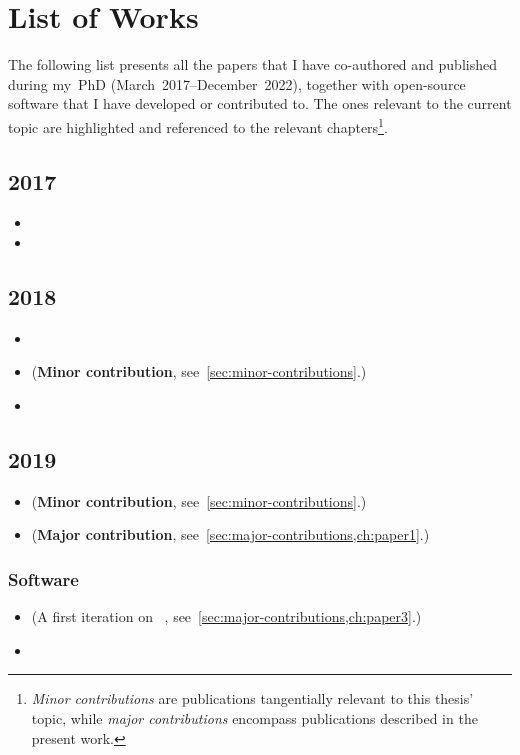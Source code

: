 \chapter{List of Works}%
\label{ch:all-works}

The following list presents all the papers that I have co-authored and published
during my~PhD (March~2017--December~2022),
together with open-source software that I have developed or contributed to.
The ones relevant to the current topic are highlighted and referenced to
the relevant chapters\footnote{\emph{Minor contributions} are publications
	tangentially relevant to this thesis' topic, while \emph{major contributions}
	encompass publications described in the present work.}.

\section*{2017}
\begin{itemize}
	\item {}
	\item {}
\end{itemize}

\section*{2018}
\begin{itemize}
	\item {}
	\item {} (\textbf{Minor contribution}, see~\cref{sec:minor-contributions}.)
	\item {}
\end{itemize}

\section*{2019}
\begin{itemize}
	\item {} (\textbf{Minor contribution}, see~\cref{sec:minor-contributions}.)
	\item {} (\textbf{Major contribution}, see~\cref{sec:major-contributions,ch:paper1}.)
\end{itemize}

\subsection*{Software}
\begin{itemize}
	\item {} (A first iteration on
	      \overreact~\cite{Schneider_2022,overreact2021zenodo}, see~\cref{sec:major-contributions,ch:paper3}.)
	\item {}
\end{itemize}


